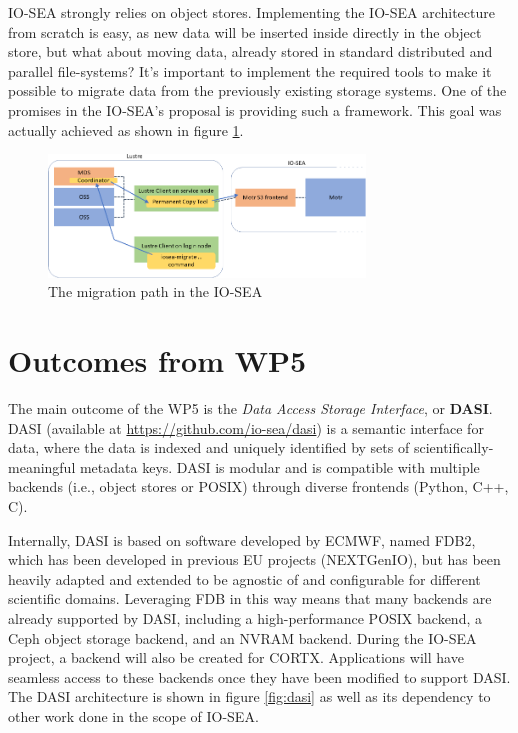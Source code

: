 IO-SEA strongly relies on object stores. Implementing the IO-SEA architecture from scratch is easy, as new
data will be inserted inside directly in the object store, but what about moving data, already stored in standard
distributed and parallel file-systems? It's important to implement the required tools to make it possible to 
migrate data from the previously existing storage systems. One of the promises in the IO-SEA's proposal is 
providing such a framework. This goal was actually achieved as shown in figure \ref{fig:migration-path}. 

\begin{figure}[H]
    \centering
    \includegraphics[width=0.75\textwidth]{FIGS/migration-path.png}
    \caption[Migration Path]{ The migration path in the IO-SEA}
    \label{fig:migration-path}
\end{figure}

\section{Outcomes from WP5}

The main outcome of the WP5 is the \textit{Data Access Storage Interface}, or \textbf{DASI}. 
DASI (available at \url{https://github.com/io-sea/dasi}) is a semantic interface for data, where the data is
indexed and uniquely identified by sets of scientifically-meaningful metadata keys. DASI is modular and is
compatible with multiple backends (i.e., object stores or POSIX) through diverse frontends (Python, C++, C).

Internally, DASI is based on software developed by ECMWF, named FDB2, which has been developed in previous EU
projects (NEXTGenIO), but has been heavily adapted and extended to be agnostic of and configurable for
different scientific domains. Leveraging FDB in this way means that many backends are already supported by DASI,
including a high-performance POSIX backend, a Ceph object storage backend, and an NVRAM backend. During the
IO-SEA project, a backend will also be created for CORTX. Applications will have seamless access to these
backends once they have been modified to support DASI. The DASI architecture is shown in figure \ref{fig:dasi}
as well as its dependency to other work done in the scope of IO-SEA.

